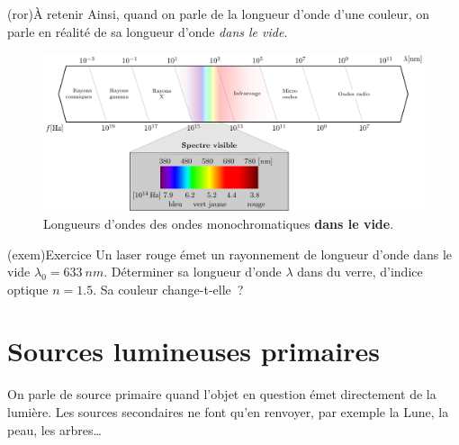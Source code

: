 \documentclass[../../main/main.tex]{subfiles}
\begin{document}
\begin{tcb*}(ror){À retenir}
	Ainsi, quand on parle de la longueur d'onde d'une couleur, on parle en réalité
	de sa longueur d'onde \textit{dans le vide}.
\end{tcb*}

\begin{figure}[h]
	\centering
	\includegraphics[width=.9\linewidth]{full_spectre}
	\caption{Longueurs d'ondes des ondes monochromatiques \textbf{dans le vide}.}
	\label{fig:lambda_vis}
\end{figure}

\begin{tcb*}(exem){Exercice}
	Un laser rouge émet un rayonnement de longueur d'onde dans le vide
	$\lambda_0 = \SI{633}{nm}$. Déterminer sa longueur d'onde $\lambda$ dans du
	verre, d'indice optique $n = \num{1.5}$. Sa couleur change-t-elle~?
	\tcblower
\end{tcb*}

\section{Sources lumineuses primaires}

On parle de source primaire quand l'objet en question émet directement de la
lumière. Les sources secondaires ne font qu'en renvoyer, par exemple la Lune, la
peau, les arbres…
\end{document}
